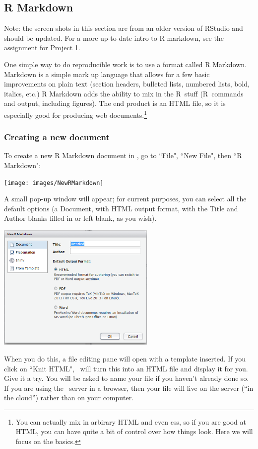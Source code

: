 \documentclass[twoside]{book}\usepackage[]{graphicx}\usepackage[]{xcolor}
\def\R{{\sf R}}
\begin{document}
\subsection{R Markdown}
Note: the screen shots in this section are from an older version of RStudio and should be updated. For a more up-to-date intro to R markdown, see the assignment for Project 1.

One simple way to do reproducible work is to use a format called R Markdown.
Markdown is a simple
mark up language that allows for a few basic improvements on plain text
(section headers, bulleted lists, numbered lists, bold, italics, etc.)  R
Markdown adds the ability to mix in the \R\ stuff (\R\ commands and output,
including figures).  
The end product is an HTML file, so it is especially good for producing web 
documents.\footnote{You can actually mix in arbirary HTML and even css, so if you
are good at HTML, you can have quite a bit of control over how things look.  Here we
will focus on the basics.}

\subsubsection{Creating a new document}
To create a new R Markdown document in \RStudio, go to ``File", ``New File", then ``R Markdown":
\begin{center}
	\texttt{[image: images/NewRMarkdown]}
\end{center}

A small pop-up window will appear; for current purposes, you can select all the default
options (a Document, with HTML output format, with the Title and Author blanks
filled in or left blank, as you wish).
\begin{center}
  \includegraphics[width=3in]{images/NewRMarkdownPopup}
\end{center}

When you do this, a file editing pane will open with a template inserted.  If
you click on ``Knit HTML", \RStudio\ will turn this into an HTML file and
display it for you.  Give it a try.  You will be asked to name your file if you
haven't already done so.  If you are using the \RStudio\ server in a browser,
then your file will live on the server (``in the cloud'') rather than on your
computer.
\end{document}
